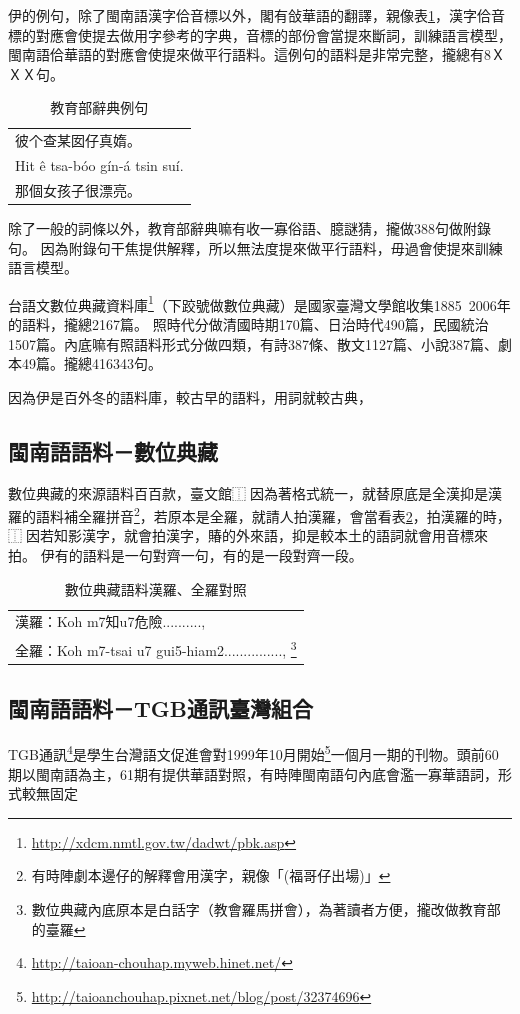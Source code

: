 \documentclass[final,oneside,onecolumn,12pt,a4paper]{book}%
\begin{document}
伊的例句，除了閩南語漢字佮音標以外，閣有敆華語的翻譯，親像表\ref{表：教育部辭典例句}，漢字佮音標的對應會使提去做用字參考的字典，音標的部份會當提來斷詞，訓練語言模型，閩南語佮華語的對應會使提來做平行語料。這例句的語料是非常完整，攏總有8ＸＸＸ句。
\begin{table}
\caption{教育部辭典例句}
\label{表：教育部辭典例句}
\centering
\begin{tabular}{l}
彼个查某囡仔真媠。 \\
Hit ê tsa-bóo gín-á tsin suí.\\
那個女孩子很漂亮。\\
\end{tabular}
\end{table}

除了一般的詞條以外，教育部辭典嘛有收一寡俗語、臆謎猜，攏做388句做附錄句。
因為附錄句干焦提供解釋，所以無法度提來做平行語料，毋過會使提來訓練語言模型。

台語文數位典藏資料庫\footnote{\url{http://xdcm.nmtl.gov.tw/dadwt/pbk.asp}}（下跤號做數位典藏）是國家臺灣文學館收集1885~2006年的語料，攏總2167篇。
照時代分做清國時期170篇、日治時代490篇，民國統治1507篇。內底嘛有照語料形式分做四類，有詩387條、散文1127篇、小說387篇、劇本49篇。攏總416343句。

因為伊是百外冬的語料庫，較古早的語料，用詞就較古典， %

\subsection{閩南語語料－數位典藏}
\label{節：數位典藏}
數位典藏的來源語料百百款，臺文館⿰因為著格式統一，就替原底是全漢抑是漢羅的語料補全羅拼音\footnote{有時陣劇本邊仔的解釋會用漢字，親像「(福哥仔出場)」}，若原本是全羅，就請人拍漢羅，會當看表\ref{表：數位典藏語料}，拍漢羅的時，⿰因若知影漢字，就會拍漢字，賰的外來語，抑是較本土的語詞就會用音標來拍。
伊有的語料是一句對齊一句，有的是一段對齊一段。

\begin{table}
\caption{數位典藏語料漢羅、全羅對照}
\label{表：數位典藏語料}
\centering
\begin{tabular}{l}
漢羅：Koh m7知u7危險.........., \\
全羅：Koh m7-tsai u7 gui5-hiam2..............., \footnote{數位典藏內底原本是白話字（教會羅馬拼會），為著讀者方便，攏改做教育部的臺羅}\\
\end{tabular}
\end{table}


\subsection{閩南語語料－TGB通訊臺灣組合}
\label{節：TGB通訊－臺灣組合}
TGB通訊\footnote{\url{http://taioan-chouhap.myweb.hinet.net/}}是學生台灣語文促進會對1999年10月開始\footnote{\url{http://taioanchouhap.pixnet.net/blog/post/32374696}}一個月一期的刊物。頭前60期以閩南語為主，61期有提供華語對照，有時陣閩南語句內底會濫一寡華語詞，形式較無固定
\end{document}
